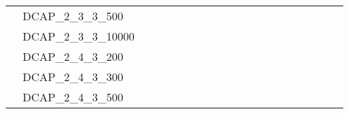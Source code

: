 \begin{table}[H]
{\begin{tabular}{|c|l|lll|lll|lllll|llll|lll|}
			& DCAP\_2\_3\_3\_500            &                          &                         &                          &                          &                         &                          &                          &                         &                         &                          &                           &                             &                             &                             &                               &                          &                          &                           \\
			& DCAP\_2\_3\_3\_10000          &                          &                         &                          &                          &                         &                          &                          &                         &                         &                          &                           &                             &                             &                             &                               &                          &                          &                           \\
			& DCAP\_2\_4\_3\_200            &                          &                         &                          &                          &                         &                          &                          &                         &                         &                          &                           &                             &                             &                             &                               &                          &                          &                           \\
			& DCAP\_2\_4\_3\_300            &                          &                         &                          &                          &                         &                          &                          &                         &                         &                          &                           &                             &                             &                             &                               &                          &                          &                           \\
			& DCAP\_2\_4\_3\_500            &                          &                         &                          &                          &                         &                          &                          &                         &                         &                          &                           &                             &                             &                             &                               &                          &                          &                           \\

\end{tabular}}
\end{table}
